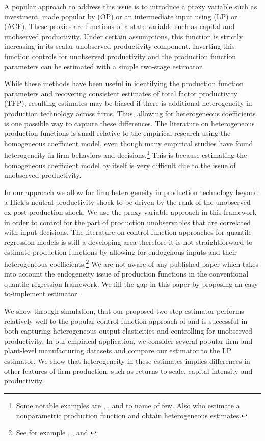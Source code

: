 \documentclass[11pt]{article}
\begin{document}
A popular approach to address this issue is to introduce a proxy variable such as investment, made popular by \cite{Olley1996} (OP) or an intermediate input using \cite{Levinsohn2003} (LP) or \cite{Ackerberg2015} (ACF). These proxies are functions of a state variable such as capital and unobserved productivity. Under certain assumptions, this function is strictly increasing in its scalar unobserved productivity component. Inverting this function controls for unobserved productivity and the production function parameters can be estimated with a simple two-stage estimator.

While these methods have been useful in identifying the production function parameters and recovering consistent estimates of total factor productivity (TFP), resulting estimates may be biased if there is additional heterogeneity in production technology across firms. Thus, allowing for heterogeneous coefficients is one possible way to capture these differences. The literature on heterogeneous production functions is small relative to the empirical research using the homogeneous coefficient model, even though many empirical studies have found heterogeneity in firm behaviors and decisions.\footnote{Some notable examples are \cite*{Kasahara2015}, \cite*{balat}, \cite*{Li2017} and \cite*{mert} to name of few. Also \cite{Gandhi2020} who estimate a nonparametric production function and obtain heterogeneous estimates.} This is because estimating the homogeneous coefficient model by itself is very difficult due to the issue of unobserved productivity. 

In our approach we allow for firm heterogeneity in production technology beyond a Hick's neutral productivity shock to be driven by the rank of the unobserved ex-post production shock.  We use the proxy variable approach in this framework in order to control for the part of production unobservables that are correlated with input decisions. The literature on control function approaches for quantile regression models is still a developing area therefore it is not straightforward to estimate production functions by allowing for endogenous inputs and their heterogeneous coefficients.\footnote{See for example \cite{Chesher2003}, \cite{Ma2006}, \cite{Lee2007} and \cite{2009a}} We are not aware of any published paper which takes into account the endogeneity issue of production functions in the conventional quantile regression framework. We fill the gap in this paper by proposing an easy-to-implement estimator.

We show through simulation, that our proposed two-step estimator performs relatively well to the popular control function approach of \cite{Levinsohn2003} and is successful in both capturing heterogeneous output elasticities and controlling for unobserved productivity. In our empirical application, we consider several popular firm and plant-level manufacturing datasets and compare our estimator to the LP estimator. We show that heterogeneity in these estimates implies differences in other features of firm production, such as returns to scale, capital intensity and productivity.
\end{document}
